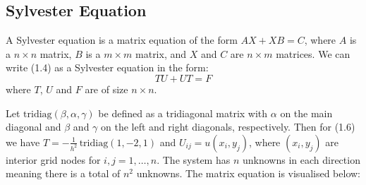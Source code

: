 \documentclass[11pt]{article}
\numberwithin{equation}{section}
\begin{document}
\subsection{Sylvester Equation}
A Sylvester equation is a matrix equation of the form $AX + XB = C$, where $A$ is a $n \times n$ matrix, $B$ is a $m \times m$ matrix, and $X$ and $C$ are $n \times m$ matrices. We can write (1.4) as a Sylvester equation in the form:
	\begin{equation}
	TU + UT = F
	\end{equation}
where $T$, $U$ and $F$ are of size $n \times n$.

Let $\text{tridiag}(\beta,\alpha,\gamma)$ be defined as a tridiagonal matrix with $\alpha$ on the main diagonal and $\beta$ and $\gamma$ on the left and right diagonals, respectively. Then for (1.6) we have $T=-\frac{1}{h^2} \, \text{tridiag}(1,-2,1)$ and $U_{ij} = u(x_i, y_j)$, where $(x_i, y_j)$ are interior grid nodes for $i,j=1,\dots,n$. The system has $n$ unknowns in each direction meaning there is a total of $n^2$ unknowns. The matrix equation is visualised below:
\end{document}
